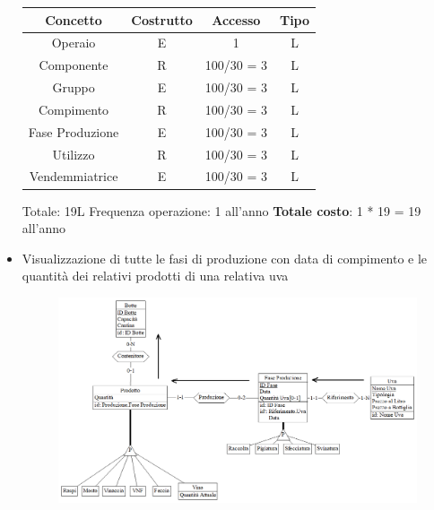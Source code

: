 \documentclass{article}
\begin{document}
\begin{itemize}
\begin{figure}[htbp]
\end{figure}
\newline
\newline
\begin{tabular}{c|c|c|c}\hline
    \textbf{Concetto} & \textbf{Costrutto} &  \textbf{Accesso} & \textbf{Tipo} \\\hline
    Operaio & E & 1 & L\\\hline
    Componente & R&  100/30 = 3 & L \\\hline
    Gruppo & E &  100/30 = 3 & L\\\hline
    Compimento & R& 100/30 = 3 & L \\\hline
    Fase Produzione& E & 100/30 = 3 & L\\\hline
    Utilizzo & R& 100/30 = 3 & L \\\hline
    Vendemmiatrice& E &  100/30 = 3 & L\\\hline
\end{tabular}
\newline
Totale: 19L \qquad \qquad Frequenza operazione: 1 all'anno
\newline
\newline
\textbf{Totale costo}: 1 * 19 = 19 all'anno\\
\newpage
\item Visualizzazione di tutte le fasi di produzione con data di compimento e le quantità dei relativi prodotti di una relativa uva 
\newline
\begin{figure}[htbp]
\centering
\includegraphics[width=1\textwidth]{img/fasi_prodotti_specifici_accessi.png}
\end{figure}
\newline
\newline
\begin{tabular}{c|c|c|c}\hline

\end{tabular}
\end{itemize}
\end{document}
